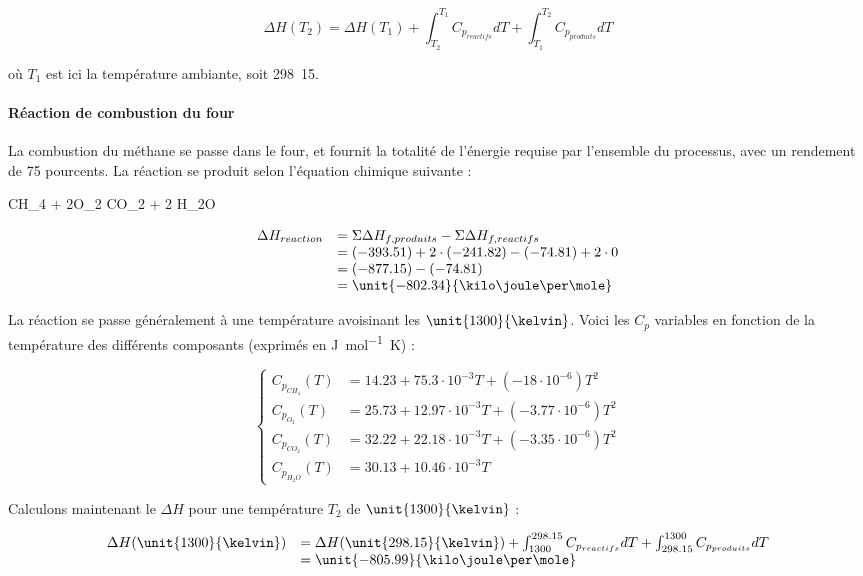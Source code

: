 $$\Delta H(T_2) = \Delta H(T_{1}) 
+ \int_{T_2}^{T_1} C_{p_{reactifs}} dT + \int_{T_1}^{T_2} C_{p_{produits}} dT$$ 

où $T_1$ est ici la température ambiante, soit \unit{298.15}{\kelvin}.

\paragraph{Réaction de combustion du four}
La combustion du méthane se passe dans le four, et fournit la totalité de l'énergie 
requise par l'ensemble du processus, avec un rendement de 75 pourcents.
La réaction se produit selon l'équation chimique suivante :

\begin{chemmath}
	CH_4 + 2O_2 \Longrightarrow CO_2 + 2 H_2O
\end{chemmath}

$$
	\begin{array}{rl}
	\Delta H_{reaction}		&=  \Sigma \Delta H_{f,produits} - \Sigma \Delta H_{f,reactifs} \\
												&=  (-393.51) + 2\cdot(-241.82) - (-74.81) + 2\cdot0 \\
												&=  (-877.15) - (-74.81)\\
												&=  \unit{-802.34}{\kilo\joule\per\mole}
	\end{array}
$$

La réaction se passe généralement à une température avoisinant les $\unit{1300}{\kelvin}$.
Voici les $C_p$ variables en fonction de la température des différents composants\cite{hc-table} 
(exprimés en \unit{\joule\per\mole\kelvin}) :

$$
	\left\{
		\begin{array}{rl}
			C_{p_{CH_4}}(T) 	&= 14.23 + 75.3\cdot10^{-3}T + (-18\cdot10^{-6})T^2 \\
			C_{p_{O_2}}(T) 		&= 25.73 + 12.97\cdot10^{-3}T + (-3.77\cdot10^{-6})T^2 \\
			C_{p_{CO_2}}(T) 	&= 32.22 + 22.18\cdot10^{-3}T + (-3.35\cdot10^{-6})T^2 \\
			C_{p_{H_2O}}(T) 	&= 30.13 + 10.46\cdot10^{-3}T 
		\end{array}
	\right.
$$	

Calculons maintenant le $\Delta H$ pour une température $T_2$ de $\unit{1300}{\kelvin}$ :

$$
	\begin{array}{rl}
		 	\Delta H(\unit{1300}{\kelvin}) 	&=  \Delta H(\unit{298.15}{\kelvin}) + \int_{1300}^{298.15} C_{p_{reactifs}} dT + \int_{298.15}^{1300} C_{p_{produits}} dT \\
																			&=  \unit{-805.99}{\kilo\joule\per\mole}
	\end{array}
$$	

